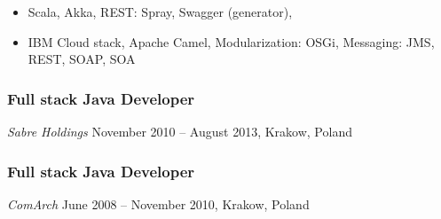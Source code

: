 \documentclass[
]{rss}
\providecommand{\tightlist}{%
  \setlength{\itemsep}{0pt}\setlength{\parskip}{0pt}}
\begin{document}
\begin{resume}
\begin{itemize}
\tightlist
\item
  Scala, Akka, REST: Spray, Swagger (generator),
\item
  IBM Cloud stack, Apache Camel, Modularization: OSGi, Messaging: JMS,
  REST, SOAP, SOA
\end{itemize}

\hypertarget{full-stack-java-developer}{%
\subsubsection{Full stack Java
Developer}\label{full-stack-java-developer}}

\emph{Sabre Holdings} November 2010 -- August 2013, Krakow, Poland

\hypertarget{full-stack-java-developer-1}{%
\subsubsection{Full stack Java
Developer}\label{full-stack-java-developer-1}}

\emph{ComArch} June 2008 -- November 2010, Krakow, Poland

\end{resume}
\end{document}
